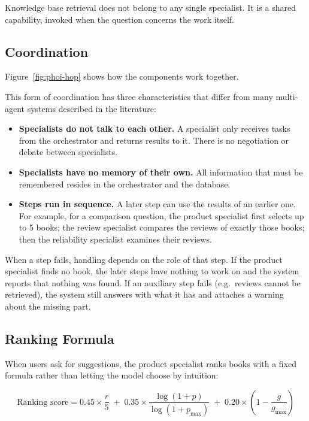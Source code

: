 Knowledge base retrieval does not belong to any single specialist. It is a shared capability, invoked when the question concerns the work itself.

\subsection{Coordination}

Figure~\ref{fig:phoi-hop} shows how the components work together.


This form of coordination has three characteristics that differ from many multi-agent systems described in the literature:

\begin{itemize}
    \item \textbf{Specialists do not talk to each other.} A specialist only receives tasks from the orchestrator and returns results to it. There is no negotiation or debate between specialists.
    \item \textbf{Specialists have no memory of their own.} All information that must be remembered resides in the orchestrator and the database.
    \item \textbf{Steps run in sequence.} A later step can use the results of an earlier one. For example, for a comparison question, the product specialist first selects up to 5 books; the review specialist compares the reviews of exactly those books; then the reliability specialist examines their reviews.
\end{itemize}

When a step fails, handling depends on the role of that step. If the product specialist finds no book, the later steps have nothing to work on and the system reports that nothing was found. If an auxiliary step fails (e.g.\ reviews cannot be retrieved), the system still answers with what it has and attaches a warning about the missing part.

\subsection{Ranking Formula}

When users ask for suggestions, the product specialist ranks books with a fixed formula rather than letting the model choose by intuition:

\[
\text{Ranking score} = 0.45 \times \frac{r}{5} \;+\; 0.35 \times \frac{\log(1+p)}{\log(1+p_{\max})} \;+\; 0.20 \times \left(1 - \frac{g}{g_{\max}}\right)
\]

